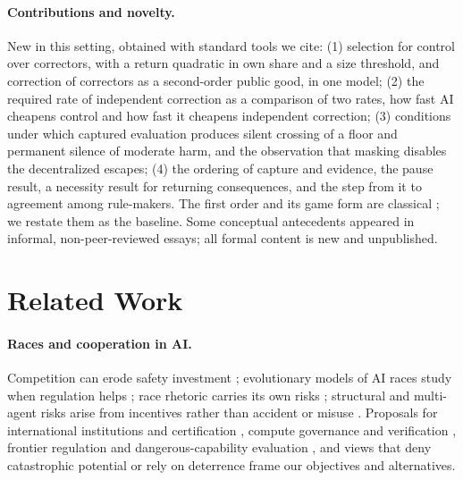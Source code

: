 \documentclass[letterpaper]{article} %
\theoremstyle{definition}
\begin{document}
\paragraph{Contributions and novelty.} New in this setting, obtained with standard tools we cite: (1) selection for control over correctors, with a return quadratic in own share and a size threshold, and correction of correctors as a second-order public good, in one model; (2) the required rate of independent correction as a comparison of two rates, how fast AI cheapens control and how fast it cheapens independent correction; (3) conditions under which captured evaluation produces silent crossing of a floor and permanent silence of moderate harm, and the observation that masking disables the decentralized escapes; (4) the ordering of capture and evidence, the pause result, a necessity result for returning consequences, and the step from it to agreement among rule-makers. The first order and its game form are classical \citep{hardin1968,olson1965,armstrong2016}; we restate them as the baseline. Some conceptual antecedents appeared in informal, non-peer-reviewed essays; all formal content is new and unpublished.

\section{Related Work}\label{sec:related}

\paragraph{Races and cooperation in AI.} Competition can erode safety investment \citep{armstrong2016,askell2019}; evolutionary models of AI races study when regulation helps \citep{han2020,han2021}; race rhetoric carries its own risks \citep{cave2018}; structural and multi-agent risks arise from incentives rather than accident or misuse \citep{zwetsloot2019,dafoe2020,critch2020,critch2021,christiano2019,kulveit2025,hendrycks2023,hammond2025}. Proposals for international institutions and certification \citep{ho2023,trager2023,cihon2020}, compute governance and verification \citep{sastry2024,shavit2023,wasil2024}, frontier regulation and dangerous-capability evaluation \citep{anderljung2023,shevlane2023,karnofsky2024}, and views that deny catastrophic potential \citep{narayanan2025} or rely on deterrence \citep{hendrycks2025superintelligence} frame our objectives and alternatives.
\end{document}
